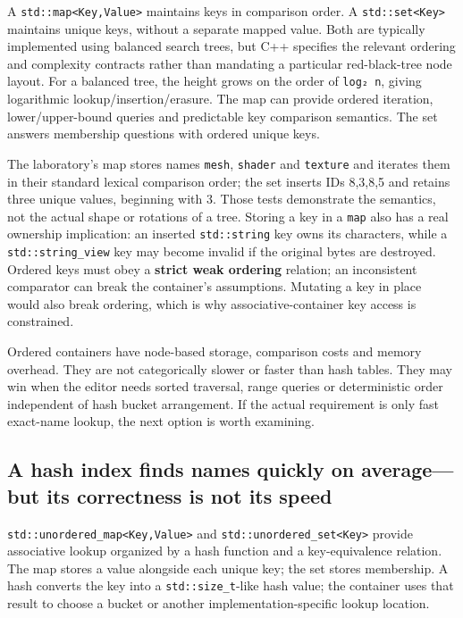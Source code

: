 A \texttt{std::map\textless{}Key,Value\textgreater{}} maintains keys in comparison order. A \texttt{std::set\textless{}Key\textgreater{}} maintains unique keys, without a separate mapped value. Both are typically implemented using balanced search trees, but C++ specifies the relevant ordering and complexity contracts rather than mandating a particular red-black-tree node layout. For a balanced tree, the height grows on the order of \texttt{log₂\ n}, giving logarithmic lookup/insertion/erasure. The map can provide ordered iteration, lower/upper-bound queries and predictable key comparison semantics. The set answers membership questions with ordered unique keys.

The laboratory's map stores names \texttt{mesh}, \texttt{shader} and \texttt{texture} and iterates them in their standard lexical comparison order; the set inserts IDs 8,3,8,5 and retains three unique values, beginning with 3. Those tests demonstrate the semantics, not the actual shape or rotations of a tree. Storing a key in a \texttt{map} also has a real ownership implication: an inserted \texttt{std::string} key owns its characters, while a \texttt{std::string\_view} key may become invalid if the original bytes are destroyed. Ordered keys must obey a \textbf{strict weak ordering} relation; an inconsistent comparator can break the container's assumptions. Mutating a key in place would also break ordering, which is why associative-container key access is constrained.

Ordered containers have node-based storage, comparison costs and memory overhead. They are not categorically slower or faster than hash tables. They may win when the editor needs sorted traversal, range queries or deterministic order independent of hash bucket arrangement. If the actual requirement is only fast exact-name lookup, the next option is worth examining.

\subsection{A hash index finds names quickly on average---but its correctness is not its speed}\label{01-foundations-i-ch006-a-hash-index-finds-names-quickly-on-averagebut-its-correctness-is-not-its-speed}

\texttt{std::unordered\_map\textless{}Key,Value\textgreater{}} and \texttt{std::unordered\_set\textless{}Key\textgreater{}} provide associative lookup organized by a hash function and a key-equivalence relation. The map stores a value alongside each unique key; the set stores membership. A hash converts the key into a \texttt{std::size\_t}-like hash value; the container uses that result to choose a bucket or another implementation-specific lookup location.

